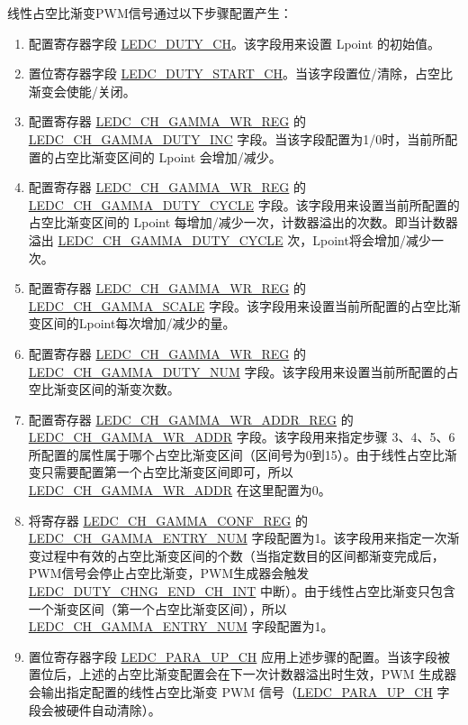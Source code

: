 \documentclass[main\_\_CN.tex]{subfiles}
\begin{document}
线性占空比渐变PWM信号通过以下步骤配置产生：
\begin{enumerate}
    \item 配置寄存器字段 \hyperref[fielddesc:LEDCDUTYCHN]{LEDC\_DUTY\_CH}。该字段用来设置 Lpoint 的初始值。
    \item 置位寄存器字段 \hyperref[fielddesc:LEDCDUTYSTARTCHN]{LEDC\_DUTY\_START\_CH}。当该字段置位/清除，占空比渐变会使能/关闭。
    \item 配置寄存器 \hyperref[regdesc:LEDCCHNGAMMAWRREG]{LEDC\_CH\_GAMMA\_WR\_REG} 的 \hyperref[fielddesc:LEDCCHNGAMMADUTYINC]{LEDC\_CH\_GAMMA\_DUTY\_INC} 字段。当该字段配置为1/0时，当前所配置的占空比渐变区间的 Lpoint 会增加/减少。
    \item 配置寄存器 \hyperref[regdesc:LEDCCHNGAMMAWRREG]{LEDC\_CH\_GAMMA\_WR\_REG} 的 \hyperref[fielddesc:LEDCCHNGAMMADUTYCYCLE]{LEDC\_CH\_GAMMA\_DUTY\_CYCLE} 字段。该字段用来设置当前所配置的占空比渐变区间的 Lpoint 每增加/减少一次，计数器溢出的次数。即当计数器溢出 \hyperref[fielddesc:LEDCCHNGAMMADUTYCYCLE]{LEDC\_CH\_GAMMA\_DUTY\_CYCLE} 次，Lpoint将会增加/减少一次。
    \item 配置寄存器 \hyperref[regdesc:LEDCCHNGAMMAWRREG]{LEDC\_CH\_GAMMA\_WR\_REG} 的 \hyperref[fielddesc:LEDCCHNGAMMASCALE]{LEDC\_CH\_GAMMA\_SCALE} 字段。该字段用来设置当前所配置的占空比渐变区间的Lpoint每次增加/减少的量。
    \item 配置寄存器 \hyperref[regdesc:LEDCCHNGAMMAWRREG]{LEDC\_CH\_GAMMA\_WR\_REG} 的 \hyperref[fielddesc:LEDCCHNGAMMADUTYNUM]{LEDC\_CH\_GAMMA\_DUTY\_NUM} 字段。该字段用来设置当前所配置的占空比渐变区间的渐变次数。
    \item 配置寄存器 \hyperref[regdesc:LEDCCHNGAMMAWRADDRREG]{LEDC\_CH\_GAMMA\_WR\_ADDR\_REG} 的 \hyperref[fielddesc:LEDCCHNGAMMAWRADDR]{LEDC\_CH\_GAMMA\_WR\_ADDR} 字段。该字段用来指定步骤 3、4、5、6 所配置的属性属于哪个占空比渐变区间（区间号为0到15）。由于线性占空比渐变只需要配置第一个占空比渐变区间即可，所以 \hyperref[fielddesc:LEDCCHNGAMMAWRADDR]{LEDC\_CH\_GAMMA\_WR\_ADDR} 在这里配置为0。
    \item 将寄存器 \hyperref[regdesc:LEDCCHNGAMMACONFREG]{LEDC\_CH\_GAMMA\_CONF\_REG} 的 \hyperref[fielddesc:LEDCCHNGAMMAENTRYNUM]{LEDC\_CH\_GAMMA\_ENTRY\_NUM} 字段配置为1。该字段用来指定一次渐变过程中有效的占空比渐变区间的个数（当指定数目的区间都渐变完成后，PWM信号会停止占空比渐变，PWM生成器会触发 \hyperref[int:ledc-duty-chng-end]{LEDC\_DUTY\_CHNG\_END\_CH\_INT} 中断）。由于线性占空比渐变只包含一个渐变区间（第一个占空比渐变区间），所以 \hyperref[fielddesc:LEDCCHNGAMMAENTRYNUM]{LEDC\_CH\_GAMMA\_ENTRY\_NUM} 字段配置为1。
    \item 置位寄存器字段 \hyperref[fielddesc:LEDCPARAUPCHN]{LEDC\_PARA\_UP\_CH} 应用上述步骤的配置。当该字段被置位后，上述的占空比渐变配置会在下一次计数器溢出时生效，PWM 生成器会输出指定配置的线性占空比渐变 PWM 信号（\hyperref[fielddesc:LEDCPARAUPCHN]{LEDC\_PARA\_UP\_CH} 字段会被硬件自动清除）。
\end{enumerate}
\end{document}
